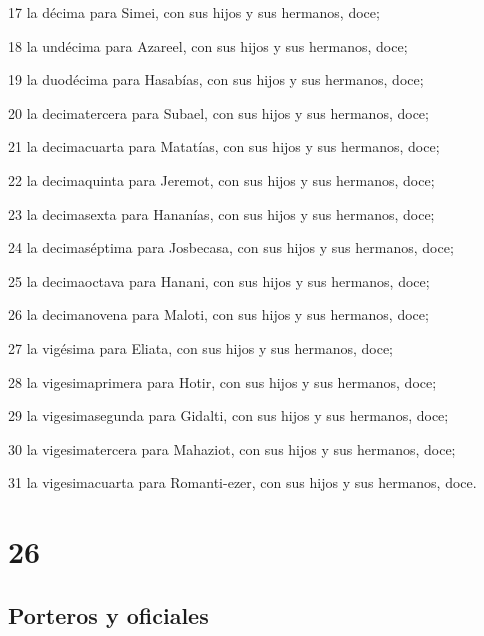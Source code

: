 \par 17 la décima para Simei, con sus hijos y sus hermanos, doce;
\par 18 la undécima para Azareel, con sus hijos y sus hermanos, doce;
\par 19 la duodécima para Hasabías, con sus hijos y sus hermanos, doce;
\par 20 la decimatercera para Subael, con sus hijos y sus hermanos, doce;
\par 21 la decimacuarta para Matatías, con sus hijos y sus hermanos, doce;
\par 22 la decimaquinta para Jeremot, con sus hijos y sus hermanos, doce;
\par 23 la decimasexta para Hananías, con sus hijos y sus hermanos, doce;
\par 24 la decimaséptima para Josbecasa, con sus hijos y sus hermanos, doce;
\par 25 la decimaoctava para Hanani, con sus hijos y sus hermanos, doce;
\par 26 la decimanovena para Maloti, con sus hijos y sus hermanos, doce;
\par 27 la vigésima para Eliata, con sus hijos y sus hermanos, doce;
\par 28 la vigesimaprimera para Hotir, con sus hijos y sus hermanos, doce;
\par 29 la vigesimasegunda para Gidalti, con sus hijos y sus hermanos, doce;
\par 30 la vigesimatercera para Mahaziot, con sus hijos y sus hermanos, doce;
\par 31 la vigesimacuarta para Romanti-ezer, con sus hijos y sus hermanos, doce.

\chapter{26}

\section*{Porteros y oficiales}

